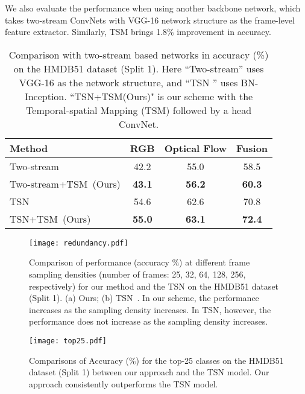 \documentclass[english, 10pt, twocolumn, twoside]{IEEEtran}
\begin{document}
We also evaluate the performance when using another backbone network, which takes two-stream ConvNets with VGG-16 network structure \cite{feichtenhofer2016convolutional} as the frame-level feature extractor. Similarly, TSM brings 1.8\% improvement in accuracy.

\begin{table}[t]
 \caption{Comparison with two-stream based networks in accuracy (\%) on the HMDB51 dataset (Split 1). Here ``Two-stream'' \cite{simonyan2014two} uses VGG-16 as the network structure, and ``TSN \cite{wang2016temporal}'' uses BN-Inception. ``TSN+TSM(Ours)" is our scheme with the Temporal-spatial Mapping (TSM) followed by a head ConvNet.}
\label{tab:twostream}
 \begin{center}
   \fontsize{9pt}{10pt}\selectfont\centering
   \begin{tabular}{|l|c|c|c|}
     \hline
     Method & RGB & Optical Flow & Fusion \\
     \hline\hline
     Two-stream \cite{feichtenhofer2016convolutional} & 42.2 & 55.0 & 58.5 \\
     Two-stream+TSM~(Ours) & \textbf{43.1} & \textbf{56.2} & \textbf{60.3} \\
     \hline
TSN \cite{wang2016temporal} & 54.6 & 62.6 & 70.8 \\
     TSN+TSM~(Ours) & \textbf{55.0} & \textbf{63.1} & \textbf{72.4} \\
     \hline
   \end{tabular}
 \end{center}
\vspace{-4mm}
\end{table}

\begin{figure*}[t]
	\texttt{[image: redundancy.pdf]}
	\vspace{-5mm}
	\caption{Comparison of performance (accuracy \%) at different frame sampling densities (number of frames: 25, 32, 64, 128, 256, respectively) for our method and the TSN on the HMDB51 dataset (Split 1). (a) Ours; (b) TSN~\cite{wang2016temporal}. In our scheme, the performance increases as the sampling density increases. In TSN, however, the performance does not increase as the sampling density increases.}
\label{fig:redun}
	\vspace{-3mm}
\end{figure*}

\begin{figure*}\begin{center}
		\texttt{[image: top25.pdf]}
		\vspace{-3mm}
		\caption{Comparisons of Accuracy (\%) for the top-25 classes on the HMDB51 dataset (Split 1) between our approach and the TSN model. Our approach consistently outperforms the TSN model.}
		\label{fig:histgram-gainclasses}
	\end{center}
\end{figure*}
\end{document}
